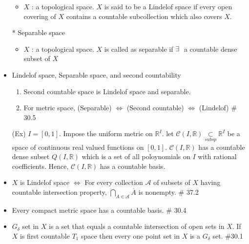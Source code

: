 \documentclass[12pt]{article}
\newcommand{\spone}{\hspace{0.1cm}}
\newcommand{\Real}{\mathbb{R}}
\newcommand{\A}{\mathcal{A}}
\newcommand{\C}{\mathcal{C}}
\newcommand{\subsp}{\underset{subsp}{\subset}}
\newcommand{\cl}{\overline}
\newcommand{\exist}{\exists\spone}
\begin{document}
\begin{itemize}
	\begin{itemize}
		\item $X$ : a topological space. $X$ is said to be a Lindelof space if every open covering of $X$ contains a countable subcollection which also covers $X$.
	\end{itemize} 
	\item[*]Separable space
	\begin{itemize}
		\item $X$ : a topological space. $X$ is called as separable if $\exist$ a countable dense subset of $X$ 
	\end{itemize}
	\item Lindelof space, Separable space, and second countability
	\begin{enumerate}
		\item Second countable space is Lindelof space and separable.
		\item For metric space, (Separable) $\Leftrightarrow$ (Second countable) $\Leftrightarrow$ (Lindelof) \quad \# 30.5
	\end{enumerate}
	\item[(Ex)] $I=[0,1]$. Impose the uniform metric on $\Real^I$. let $\C(I, \Real)\subsp \Real^I$ be a space of continuous real valued functions on $[0,1]$. $\C(I, \Real)$  has a countable dense subset $Q(I, \Real)$ which is a set of all poloynomials on $I$ with rational coefficients. Hence, $\C(I, \Real)$ has a countable basis.
	\item $X$ is Lindelof space $\Leftrightarrow$ For every collection $\A$ of subsets of $X$ having countable intersection property, $\bigcap_{A\in \A}\cl{A}$ is nonempty. \quad \# 37.2
	\item Every compact metric space has a countable basis. \quad \# 30.4
	\item $G_\delta$ set in $X$ is a set that equals a countable intersection of open sets in $X$. If $X$ is first countable $T_1$ space then every one point set in $X$ is a $G_\delta$ set. \quad \#30.1
\end{itemize}
\bigskip
\end{document}
